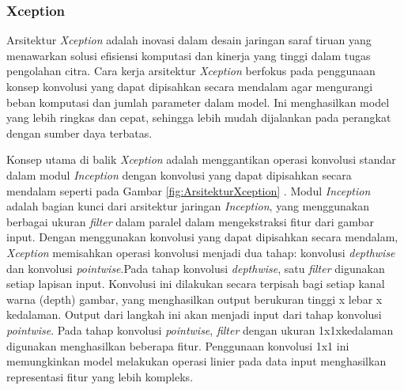 \subsubsection{Xception}
Arsitektur \textit{Xception} adalah inovasi dalam desain jaringan saraf tiruan yang menawarkan solusi efisiensi komputasi dan kinerja yang tinggi dalam tugas pengolahan citra. Cara kerja arsitektur \textit{Xception} berfokus pada penggunaan konsep konvolusi yang dapat dipisahkan secara mendalam agar mengurangi beban komputasi dan jumlah parameter dalam model. Ini menghasilkan model yang lebih ringkas dan cepat, sehingga lebih mudah dijalankan pada perangkat dengan sumber daya terbatas.

Konsep utama di balik \textit{Xception} adalah menggantikan operasi konvolusi standar dalam modul \textit{Inception} dengan konvolusi yang dapat dipisahkan secara mendalam seperti pada Gambar \ref{fig:ArsitekturXception}
. Modul \textit{Inception} adalah bagian kunci dari arsitektur jaringan \textit{Inception}, yang menggunakan berbagai ukuran \textit{filter} dalam paralel dalam mengekstraksi fitur dari gambar input. Dengan menggunakan konvolusi yang dapat dipisahkan secara mendalam, \textit{Xception} memisahkan operasi konvolusi menjadi dua tahap: konvolusi \textit{depthwise} dan konvolusi \textit{pointwise}.Pada tahap konvolusi \textit{depthwise}, satu \textit{filter} digunakan setiap lapisan input. Konvolusi ini dilakukan secara terpisah bagi setiap kanal warna (depth) gambar, yang menghasilkan output berukuran tinggi x lebar x kedalaman. Output dari langkah ini akan menjadi input dari tahap konvolusi \textit{pointwise}. Pada tahap konvolusi \textit{pointwise}, \textit{filter} dengan ukuran 1x1xkedalaman digunakan menghasilkan beberapa fitur. Penggunaan konvolusi 1x1 ini memungkinkan model melakukan operasi linier pada data input menghasilkan representasi fitur yang lebih kompleks.

